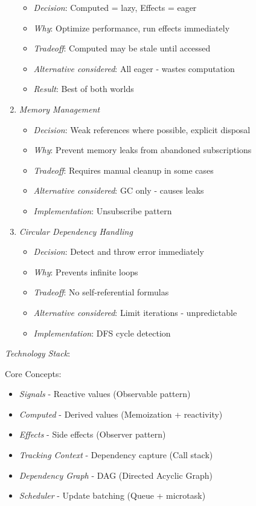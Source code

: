 \documentclass[11pt]{article}
\begin{document}
\begin{enumerate}
\begin{itemize}
\item \emph{Decision}: Computed = lazy, Effects = eager
\item \emph{Why}: Optimize performance, run effects immediately
\item \emph{Tradeoff}: Computed may be stale until accessed
\item \emph{Alternative considered}: All eager - wastes computation
\item \emph{Result}: Best of both worlds
\end{itemize}

\item \emph{Memory Management}

\begin{itemize}
\item \emph{Decision}: Weak references where possible, explicit disposal
\item \emph{Why}: Prevent memory leaks from abandoned subscriptions
\item \emph{Tradeoff}: Requires manual cleanup in some cases
\item \emph{Alternative considered}: GC only - causes leaks
\item \emph{Implementation}: Unsubscribe pattern
\end{itemize}

\item \emph{Circular Dependency Handling}

\begin{itemize}
\item \emph{Decision}: Detect and throw error immediately
\item \emph{Why}: Prevents infinite loops
\item \emph{Tradeoff}: No self-referential formulas
\item \emph{Alternative considered}: Limit iterations - unpredictable
\item \emph{Implementation}: DFS cycle detection
\end{itemize}
\end{enumerate}

\emph{Technology Stack}:

Core Concepts:

\begin{itemize}
\item \emph{Signals} - Reactive values (Observable pattern)
\item \emph{Computed} - Derived values (Memoization + reactivity)
\item \emph{Effects} - Side effects (Observer pattern)
\item \emph{Tracking Context} - Dependency capture (Call stack)
\item \emph{Dependency Graph} - DAG (Directed Acyclic Graph)
\item \emph{Scheduler} - Update batching (Queue + microtask)
\end{itemize}
\end{document}
